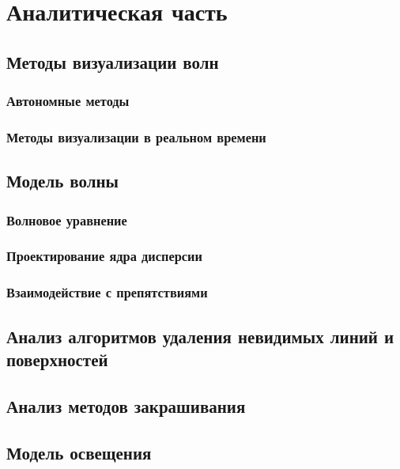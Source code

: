 \chapter{Аналитическая часть}

\section{Методы визуализации волн}

\subsection{Автономные методы}

\subsection{Методы визуализации в реальном времени}

\section{Модель волны}

\subsection{Волновое уравнение}

\subsection{Проектирование ядра дисперсии}

\subsection{Взаимодействие с препятствиями}

\section{Анализ алгоритмов удаления невидимых линий и поверхностей}

\section{Анализ методов закрашивания}

\section{Модель освещения}

